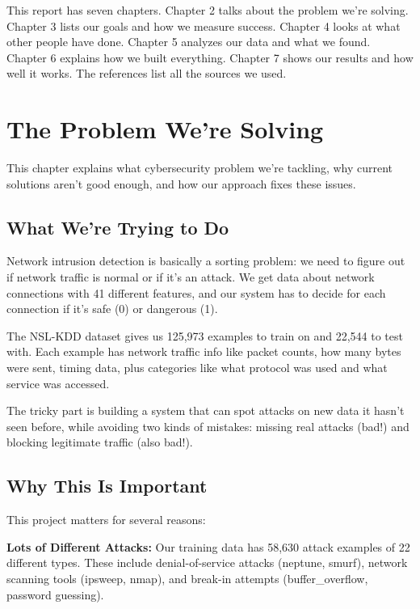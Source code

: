\documentclass[12pt,a4paper]{report}
\begin{document}
This report has seven chapters. Chapter 2 talks about the problem we're solving. Chapter 3 lists our goals and how we measure success. Chapter 4 looks at what other people have done. Chapter 5 analyzes our data and what we found. Chapter 6 explains how we built everything. Chapter 7 shows our results and how well it works. The references list all the sources we used.

\chapter{The Problem We're Solving}

This chapter explains what cybersecurity problem we're tackling, why current solutions aren't good enough, and how our approach fixes these issues.

\section{What We're Trying to Do}

Network intrusion detection is basically a sorting problem: we need to figure out if network traffic is normal or if it's an attack. We get data about network connections with 41 different features, and our system has to decide for each connection if it's safe (0) or dangerous (1).

The NSL-KDD dataset gives us 125,973 examples to train on and 22,544 to test with. Each example has network traffic info like packet counts, how many bytes were sent, timing data, plus categories like what protocol was used and what service was accessed.

The tricky part is building a system that can spot attacks on new data it hasn't seen before, while avoiding two kinds of mistakes: missing real attacks (bad!) and blocking legitimate traffic (also bad!).

\section{Why This Is Important}

This project matters for several reasons:

\textbf{Lots of Different Attacks:} Our training data has 58,630 attack examples of 22 different types. These include denial-of-service attacks (neptune, smurf), network scanning tools (ipsweep, nmap), and break-in attempts (buffer\_overflow, password guessing).
\end{document}
